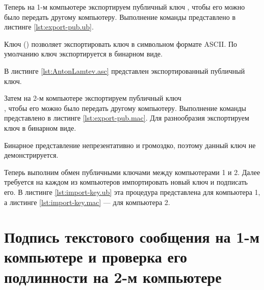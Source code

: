 Теперь на 1-м компьютере экспортируем публичный ключ , чтобы его можно было передать другому компьютеру. Выполнение команды представлено в листинге \ref{lst:export-pub.ub}.



Ключ  () позволяет экспортировать ключ в символьном формате ASCII. По умолчанию ключ экспортируется в бинарном виде.

В листинге \ref{lst:AntonLamtev.asc} представлен экспортированный публичный ключ.




Затем на 2-м компьютере экспортируем публичный ключ\\ , чтобы его можно было передать другому компьютеру. Выполнение команды представлено в листинге \ref{lst:export-pub.mac}. Для разнообразия экспортируем ключ в бинарном виде.



Бинарное представление непрезентативно и громоздко, поэтому данный ключ не демонстрируется.

Теперь выполним обмен публичными ключами между компьютерами 1 и 2. Далее требуется на каждом из компьютеров импортировать новый ключ и подписать его. В листинге \ref{lst:import-key.ub} эта процедура представлена для компьютера 1, а листинге \ref{lst:import-key.mac} --- для компьютера 2.





\section{Подпись текстового сообщения на 1-м компьютере и проверка его подлинности на 2-м компьютере}

